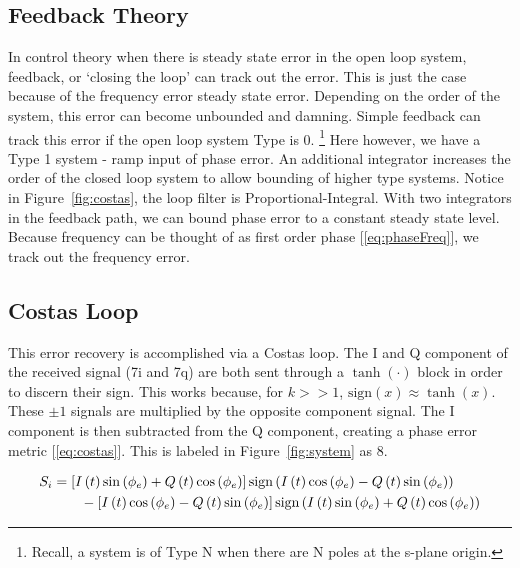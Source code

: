\documentclass[]{article}
\newcommand{\rom}[1]{\uppercase\expandafter{\romannumeral#1}}
\begin{document}
\subsection{Feedback Theory}
\label{sec:feedback}
In control theory when there is steady state error in the open loop system, feedback, or `closing the loop' can track out the error. This is just the case because of the frequency error steady state error.  Depending on the order of the system, this error can become unbounded and damning.  Simple feedback can track this error if the open loop system Type is 0.  \footnote{Recall, a system is of Type N when there are N poles at the s-plane origin.}  Here however, we have a Type 1 system - ramp input of phase error.  An additional integrator increases the order of the closed loop system to allow bounding of higher type systems.  Notice in Figure~\ref{fig:costas}, the loop filter is Proportional-Integral.  With two integrators in the feedback path, we can bound phase error to a constant steady state level.  Because frequency can be thought of as first order phase [\ref{eq:phaseFreq}], we track out the frequency error.\\

\subsection{Costas Loop}
\label{sec:costas}
This error recovery is accomplished via a Costas loop. The I and Q component of the received signal (7i and 7q) are both sent through a $\tanh\left(\cdot\right)$ block in order to discern their sign.  This works because, for $k>>1$, $\text{sign}\left(x\right) \approx \tanh \left(x\right)$.  These $\pm1$ signals are multiplied by the opposite component signal.  The I component is then subtracted from the Q component, creating a phase error metric [\ref{eq:costas}].  This is labeled in Figure~\ref{fig:system} as 8. 

\begin{align}
  \label{eq:costas}
  S_{\rom{1}} &= \left[I\left(t\right)\sin\left(\phi_e\right)+Q\left(t\right)\cos\left(\phi_e\right)\right]\text{sign}\left(I\left(t\right)\cos\left(\phi_e\right)- Q\left(t\right)\sin\left(\phi_e\right)\right)\nonumber \\
  &\qquad {} - \left[I\left(t\right)\cos\left(\phi_e\right)-Q\left(t\right)\sin\left(\phi_e\right)\right]\text{sign}\left(I\left(t\right)\sin\left(\phi_e\right)+Q\left(t\right)\cos\left(\phi_e\right)\right)
  \end{align}
\end{document}
